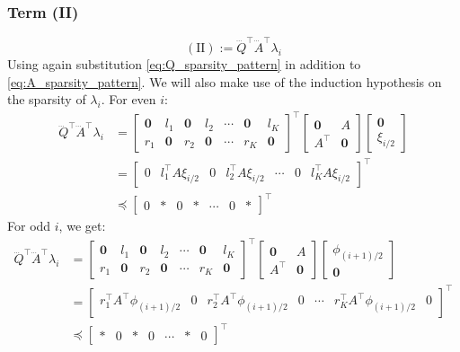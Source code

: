 \documentclass[a4paper,12pt]{article}
\theoremstyle{definition}
\begin{document}
\subsubsection{Term (II)}
$$(\text{II}) := \dddot{Q}^\top \dddot{A}^\top \lambda_i $$
Using again substitution \eqref{eq:Q_sparsity_pattern} in addition to \eqref{eq:A_sparsity_pattern}. We will also make use of the induction hypothesis on the sparsity of $\lambda_i$.
For even $i$:
\begin{align}
    \dddot{Q}^\top \dddot{A}^\top \lambda_i &= 
    \begin{bmatrix}\mathbf{0} & l_1 & \mathbf{0} & l_2 & \cdots & \mathbf{0} & l_K \\ r_1 & \mathbf{0} & r_2 & \mathbf{0} &  \cdots & r_K & \mathbf{0} \end{bmatrix} ^\top \begin{bmatrix} \mathbf{0} & A \\ A^\top & \mathbf{0} \end{bmatrix} \begin{bmatrix} \mathbf{0} \\ \xi_{i/2} \end{bmatrix}
    \\
    &= \begin{bmatrix} 0 & l_1^\top A\xi_{i/2} & 0 & l_2^\top A\xi_{i/2}  & \cdots & 0 & l_K^\top A\xi_{i/2} \end{bmatrix} ^\top
    \\
    &\preceq \begin{bmatrix} 0 & * & 0 & * & \cdots & 0 & * \end{bmatrix}^\top
\end{align}
For odd $i$, we get:
\begin{align}
    \dddot{Q}^\top \dddot{A}^\top \lambda_i &= 
    \begin{bmatrix}\mathbf{0} & l_1 & \mathbf{0} & l_2 & \cdots & \mathbf{0} & l_K \\ r_1 & \mathbf{0} & r_2 & \mathbf{0} &  \cdots & r_K & \mathbf{0} \end{bmatrix} ^\top \begin{bmatrix} \mathbf{0} & A \\ A^\top & \mathbf{0} \end{bmatrix} \begin{bmatrix} \phi_{(i+1)/2} \\ \mathbf{0} \end{bmatrix}
    \\
    &= \begin{bmatrix} r_1^\top A^\top \phi_{(i+1)/2} & 0 & r_2^\top A^\top \phi_{(i+1)/2}  & 0 & \cdots & r_K^\top A^\top \phi_{(i+1)/2} & 0 \end{bmatrix} ^\top
    \\
    &\preceq \begin{bmatrix} * & 0 & * & 0 & \cdots & * & 0 \end{bmatrix}^\top
\end{align}
\end{document}
